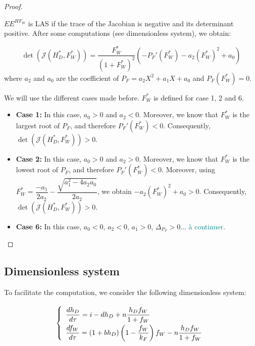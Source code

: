 \documentclass{article}
\newcommand{\marc}[1]{\textcolor{teal}{#1}}
\begin{document}
\begin{proof}
\begin{itemize}
$EE^{HF_W}$ is LAS if the trace of the Jacobian is negative and its determinant positive. After some computations (see dimensionless system), we obtain:

\begin{equation*}
\det(\mathcal{J}(H_D^*, F_W^*))  = \dfrac{F_W^*}{(1 + F_W^*)^2}\left( - P_F'(F_W^*) - a_2(F_W^*)^2  + a_0 \right)
\end{equation*}
where $a_2$ and $a_0$ are the coefficient of $P_F = a_2 X^2 + a_1 X + a_0$ and $P_F(F_W^*) = 0$.

We will use the different cases made before. $F_W^*$ is defined for case 1, 2 and 6.
\begin{itemize}
\item \textbf{Case 1:} In this case, $a_0 > 0$ and $a_2 < 0$. Moreover, we know that $F_W^*$ is the largest root of $P_F$, and therefore $P_F'(F_W^*) < 0$. Consequently, $\det(\mathcal{J}(H_D^*, F_W^*)) > 0$.
\item \textbf{Case 2:} In this case, $a_0 > 0$ and $a_2 > 0$. Moreover, we know that $F_W^*$ is the lowest root of $P_F$, and therefore $P_F'(F_W^*) < 0$. Moreover, using $F_W^* = \dfrac{-a_1}{2a_2} - \dfrac{\sqrt{a_1^2 - 4 a_2 a_0}}{2a_2}$, we obtain $- a_2(F_W^*)^2  + a_0 > 0$. Consequently, $\det(\mathcal{J}(H_D^*, F_W^*)) > 0$.
\item \textbf{Case 6:} In this case, $a_0 < 0$, $a_2 < 0$, $a_1 > 0$, $\Delta_{P_F} > 0$... \marc{à continuer}.
\end{itemize}





\end{itemize}
\end{proof}

\subsection{Dimensionless system}
To facilitate the computation, we consider the following dimensionless system:

\begin{equation}
\def\arraystretch{2}
\left\lbrace \begin{array}{l}
\dfrac{dh_D}{d\tau} = i - d h_D + n \dfrac{h_D f_W}{1 + f_W} \\
\dfrac{df_W}{d \tau} = (1+ b h_D) \left(1 - \dfrac{f_W}{k_F} \right) f_W - n \dfrac{h_D f_W}{1 + f_W}
\end{array} \right.
\label{0dimSystem}
\end{equation}
\end{document}
